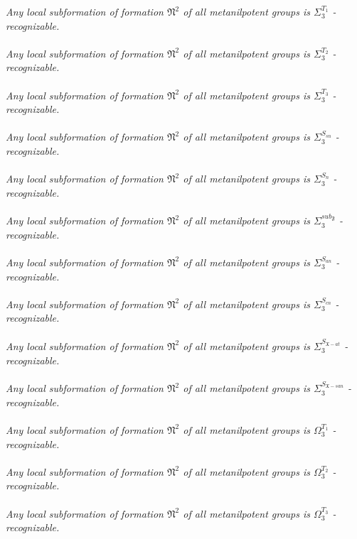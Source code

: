 \documentclass[a4paper,14pt]{extarticle}
\begin{document}
{\it Any local subformation of formation $\mathfrak{N}^2$ of all metanilpotent groups is $\Sigma_3^{T_1}$ - recognizable.} \\\\ 
{\it Any local subformation of formation $\mathfrak{N}^2$ of all metanilpotent groups is $\Sigma_3^{T_2}$ - recognizable.} \\\\ 
{\it Any local subformation of formation $\mathfrak{N}^2$ of all metanilpotent groups is $\Sigma_3^{T_3}$ - recognizable.} \\\\ 
{\it Any local subformation of formation $\mathfrak{N}^2$ of all metanilpotent groups is $\Sigma_3^{S_{sn}}$ - recognizable.} \\\\ 
{\it Any local subformation of formation $\mathfrak{N}^2$ of all metanilpotent groups is $\Sigma_3^{S_n}$ - recognizable.} \\\\ 
{\it Any local subformation of formation $\mathfrak{N}^2$ of all metanilpotent groups is $\Sigma_3^{sub_\mathfrak{F}}$ - recognizable.} \\\\ 
{\it Any local subformation of formation $\mathfrak{N}^2$ of all metanilpotent groups is $\Sigma_3^{S_{an}}$ - recognizable.} \\\\ 
{\it Any local subformation of formation $\mathfrak{N}^2$ of all metanilpotent groups is $\Sigma_3^{S_{cn}}$ - recognizable.} \\\\ 
{\it Any local subformation of formation $\mathfrak{N}^2$ of all metanilpotent groups is $\Sigma_3^{S_{\mathfrak{X}-at}}$ - recognizable.} \\\\ 
{\it Any local subformation of formation $\mathfrak{N}^2$ of all metanilpotent groups is $\Sigma_3^{S_{\mathfrak{X}-san}}$ - recognizable.} \\\\ 
{\it Any local subformation of formation $\mathfrak{N}^2$ of all metanilpotent groups is $\Omega_3^{T_1}$ - recognizable.} \\\\ 
{\it Any local subformation of formation $\mathfrak{N}^2$ of all metanilpotent groups is $\Omega_3^{T_2}$ - recognizable.} \\\\ 
{\it Any local subformation of formation $\mathfrak{N}^2$ of all metanilpotent groups is $\Omega_3^{T_3}$ - recognizable.} \\\\ 
\end{document}
